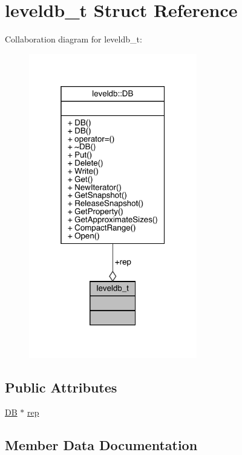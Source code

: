 \hypertarget{structleveldb__t}{}\section{leveldb\+\_\+t Struct Reference}
\label{structleveldb__t}


Collaboration diagram for leveldb\+\_\+t\+:
\nopagebreak
\begin{figure}[H]
\begin{center}
\leavevmode
\includegraphics[width=208pt]{structleveldb__t__coll__graph}
\end{center}
\end{figure}
\subsection*{Public Attributes}
\begin{DoxyCompactItemize}
\item 
\mbox{\hyperlink{classleveldb_1_1_d_b}{DB}} $\ast$ \mbox{\hyperlink{structleveldb__t_af8f1950b2c676ccc37e4095f558261ad}{rep}}
\end{DoxyCompactItemize}


\subsection{Member Data Documentation}
\mbox{\label{structleveldb__t_af8f1950b2c676ccc37e4095f558261ad}} 
